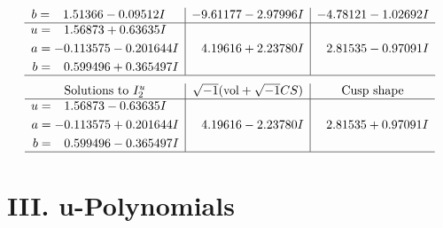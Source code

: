 \documentclass[1p]{elsarticle_modified}
\theoremstyle{definition}
\newcommand{\I}{\sqrt{-1}}
\begin{document}
$$\begin{array}{c|c|c}
\begin{aligned}
b &= \phantom{-}1.51366 - 0.09512 I\end{aligned}
 & -9.61177 - 2.97996 I & -4.78121 - 1.02692 I \\ \hline\begin{aligned}
u &= \phantom{-}1.56873 + 0.63635 I \\
a &= -0.113575 - 0.201644 I \\
b &= \phantom{-}0.599496 + 0.365497 I\end{aligned}
 & \phantom{-}4.19616 + 2.23780 I & \phantom{-}2.81535 - 0.97091 I\\
 \hline 
 \end{array}$$\newpage$$\begin{array}{c|c|c}  
\text{Solutions to }I^u_{2}& \I (\text{vol} + \sqrt{-1}CS) & \text{Cusp shape}\\
 \hline 
\begin{aligned}
u &= \phantom{-}1.56873 - 0.63635 I \\
a &= -0.113575 + 0.201644 I \\
b &= \phantom{-}0.599496 - 0.365497 I\end{aligned}
 & \phantom{-}4.19616 - 2.23780 I & \phantom{-}2.81535 + 0.97091 I\\
 \hline 
 \end{array}$$\newpage
\newpage\renewcommand{\arraystretch}{1}
\centering \section*{ III. u-Polynomials}
\end{document}

